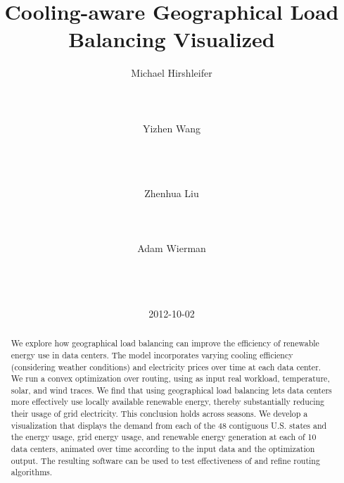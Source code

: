 \documentclass{acm_proc_article-sp}
\begin{document}
\title{Cooling-aware Geographical Load Balancing Visualized}
\author{
%
%
\alignauthor
Michael Hirshleifer\\
	\\
	\\
	\\
\alignauthor
Yizhen Wang\\
	\\
	\\
	\\
\and
\alignauthor
Zhenhua Liu\\
	\\
	\\
	\\
\alignauthor
Adam Wierman\\
	\\
	\\
	\\
}

\date{2012-10-02}

\maketitle
\begin{abstract}
We explore how geographical load balancing can improve the efficiency of renewable energy use in data centers.
The model incorporates varying cooling efficiency (considering weather conditions) and electricity prices over time at each data center.
We run a convex optimization over routing, using as input real workload, temperature, solar, and wind traces.
We find that using geographical load balancing lets data centers more effectively use locally available renewable energy, thereby substantially reducing their usage of grid electricity. This conclusion holds across seasons.
We develop a visualization that displays the demand from each of the 48 contiguous U.S. states and the energy usage, grid energy usage, and renewable energy generation at each of 10 data centers, animated over time according to the input data and the optimization output. The resulting software can be used to test effectiveness of and refine routing algorithms.
\end{abstract}
\end{document}

